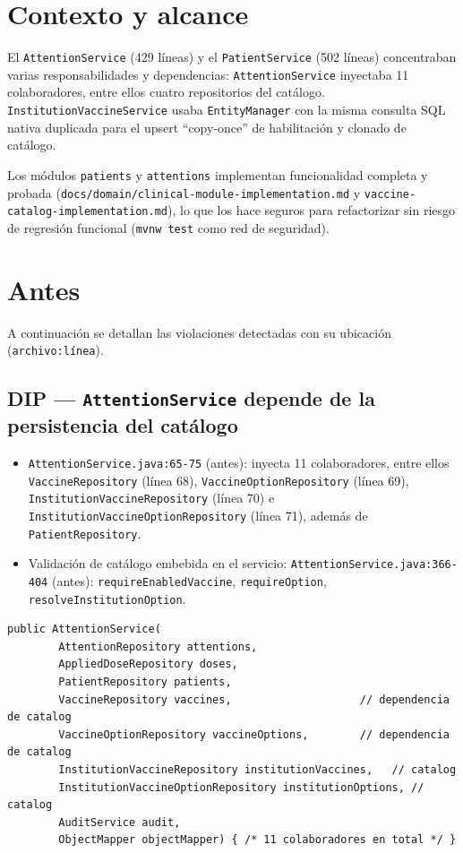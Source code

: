 \documentclass[11pt,a4paper]{article}
\begin{document}
\section{Contexto y alcance}

El \texttt{AttentionService} (429 líneas) y el \texttt{PatientService} (502
líneas) concentraban varias responsabilidades y dependencias:
\texttt{AttentionService} inyectaba 11 colaboradores, entre ellos cuatro
repositorios del catálogo. \texttt{InstitutionVaccineService} usaba
\texttt{EntityManager} con la misma consulta SQL nativa duplicada para el
upsert ``copy-once'' de habilitación y clonado de catálogo.

Los módulos \texttt{patients} y \texttt{attentions} implementan funcionalidad
completa y probada (\texttt{docs/domain/clinical-module-implementation.md} y
\texttt{vaccine-catalog-implementation.md}), lo que los hace seguros para
refactorizar sin riesgo de regresión funcional (\texttt{mvnw test} como red de
seguridad).

\section{Antes} \label{sec:antes}

A continuación se detallan las violaciones detectadas con su ubicación
(\texttt{archivo:línea}).

\subsection{DIP --- \texttt{AttentionService} depende de la persistencia del catálogo}

\begin{itemize}
  \item \texttt{AttentionService.java:65-75} (antes): inyecta 11 colaboradores,
        entre ellos \texttt{VaccineRepository} (línea 68),
        \texttt{VaccineOptionRepository} (línea 69),
        \texttt{InstitutionVaccineRepository} (línea 70) e
        \texttt{InstitutionVaccineOptionRepository} (línea 71), además de
        \texttt{PatientRepository}.
  \item Validación de catálogo embebida en el servicio:
        \texttt{AttentionService.java:366-404} (antes):
        \texttt{requireEnabledVaccine}, \texttt{requireOption},
        \texttt{resolveInstitutionOption}.
\end{itemize}

\begin{lstlisting}[caption={AttentionService.java --- constructor (antes), fragmento real de la base pre-refactor}]
public AttentionService(
        AttentionRepository attentions,
        AppliedDoseRepository doses,
        PatientRepository patients,
        VaccineRepository vaccines,                    // dependencia de catalog
        VaccineOptionRepository vaccineOptions,        // dependencia de catalog
        InstitutionVaccineRepository institutionVaccines,   // catalog
        InstitutionVaccineOptionRepository institutionOptions, // catalog
        AuditService audit,
        ObjectMapper objectMapper) { /* 11 colaboradores en total */ }
\end{lstlisting}
\end{document}
